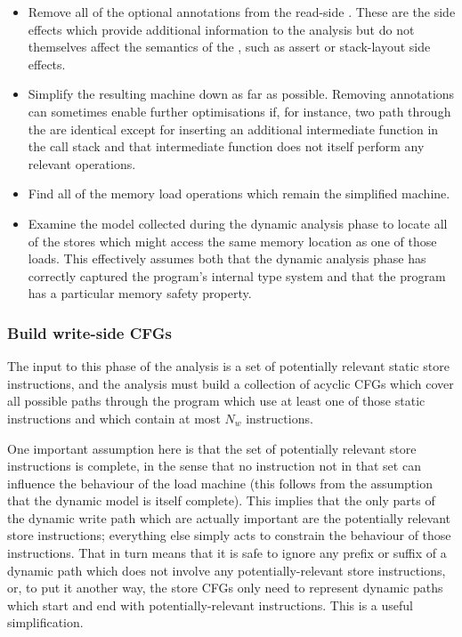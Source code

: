 \begin{itemize}
\item
  Remove all of the optional annotations from the read-side \StateMachine.
  These are the side effects which provide additional information to the analysis but do not themselves affect the semantics of the \StateMachine, such as assert or stack-layout side effects.
\item
  Simplify the resulting machine down as far as possible.
  Removing annotations can sometimes enable further optimisations if, for instance, two path through the \StateMachine are identical except for inserting an additional intermediate function in the call stack and that intermediate function does not itself perform any relevant operations.
\item
  Find all of the memory load operations which remain the simplified machine.
\item
  Examine the model collected during the dynamic analysis phase to locate all of the stores which might access the same memory location as one of those loads.
  This effectively assumes both that the dynamic analysis phase has correctly captured the program's internal type system and that the program has a particular memory safety property.
\end{itemize}

\subsubsection{Build write-side CFGs}

The input to this phase of the analysis is a set of potentially relevant static store instructions, and the analysis must build a collection of acyclic CFGs which cover all possible paths through the program which use at least one of those static instructions and which contain at most $N_w$ instructions.

One important assumption here is that the set of potentially relevant store instructions is complete, in the sense that no instruction not in that set can influence the behaviour of the load machine (this follows from the assumption that the dynamic model is itself complete).
This implies that the only parts of the dynamic write path which are actually important are the potentially relevant store instructions; everything else simply acts to constrain the behaviour of those instructions.
That in turn means that it is safe to ignore any prefix or suffix of a dynamic path which does not involve any potentially-relevant store instructions, or, to put it another way, the store CFGs only need to represent dynamic paths which start and end with potentially-relevant instructions.
This is a useful simplification.

